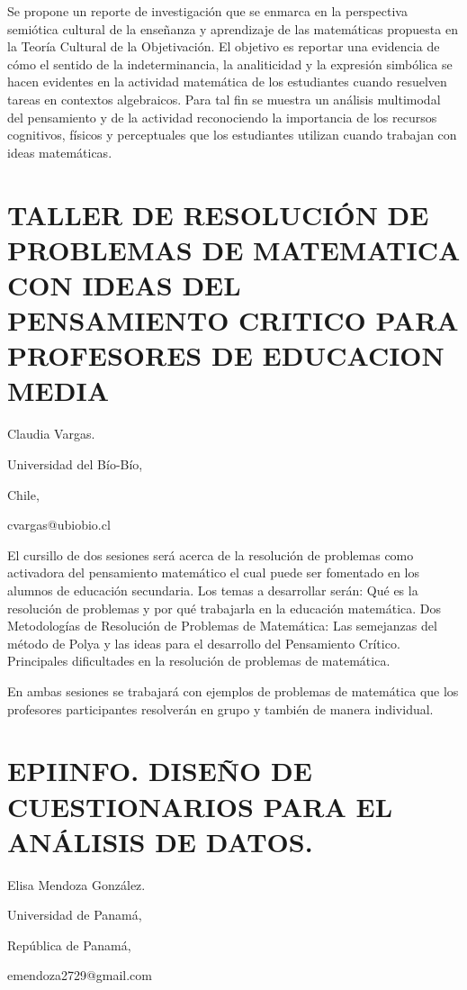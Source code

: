 Se propone un reporte de investigación que se enmarca en la perspectiva
semiótica cultural de la enseñanza y aprendizaje de las matemáticas
propuesta en la Teoría Cultural de la Objetivación. El objetivo es
reportar una evidencia de cómo el sentido de la indeterminancia, la
analiticidad y la expresión simbólica se hacen evidentes en la actividad
matemática de los estudiantes cuando resuelven tareas en contextos
algebraicos. Para tal fin se muestra un análisis multimodal del pensamiento
y de la actividad reconociendo la importancia de los recursos cognitivos,
físicos y perceptuales que los estudiantes utilizan cuando trabajan
con ideas matemáticas. 


\section{TALLER DE RESOLUCIÓN DE PROBLEMAS DE MATEMATICA CON IDEAS DEL PENSAMIENTO
CRITICO PARA PROFESORES DE EDUCACION MEDIA }

\begin{datos}

Claudia Vargas.

Universidad del Bío-Bío, 

Chile,

cvargas@ubiobio.cl

\end{datos}

El cursillo de dos sesiones será acerca de la resolución de problemas
como activadora del pensamiento matemático el cual puede ser fomentado
en los alumnos de educación secundaria. Los temas a desarrollar serán:
Qué es la resolución de problemas y por qué trabajarla en la educación
matemática. Dos Metodologías de Resolución de Problemas de Matemática:
Las semejanzas del método de Polya y las ideas para el desarrollo
del Pensamiento Crítico. Principales dificultades en la resolución
de problemas de matemática.

En ambas sesiones se trabajará con ejemplos de problemas de matemática
que los profesores participantes resolverán en grupo y también de
manera individual.

\setcounter{section}{55}


\section{EPIINFO. DISEÑO DE CUESTIONARIOS PARA EL ANÁLISIS DE DATOS.}

\begin{datos}

Elisa Mendoza González.

Universidad de Panamá, 

República de Panamá,

emendoza2729@gmail.com

\end{datos}

